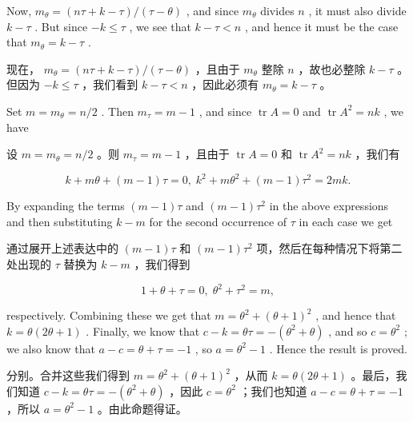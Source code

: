 \documentclass[10pt]{article}
\begin{document}
Now, \({m}_{\theta } = \left( {{n\tau } + k - \tau }\right) /\left( {\tau  - \theta }\right)\) , and since \({m}_{\theta }\) divides \(n\) , it must also divide \(k - \tau\) . But since \(- k \leq  \tau\) , we see that \(k - \tau  < n\) , and hence it must be the case that \({m}_{\theta } = k - \tau\) .

\begin{tcolorbox}\relax
现在， \({m}_{\theta } = \left( {{n\tau } + k - \tau }\right) /\left( {\tau  - \theta }\right)\) ，且由于 \({m}_{\theta }\) 整除 \(n\) ，故也必整除 \(k - \tau\) 。但因为 \(- k \leq  \tau\) ，我们看到 \(k - \tau  < n\) ，因此必须有 \({m}_{\theta } = k - \tau\) 。
\end{tcolorbox}

Set \(m = {m}_{\theta } = n/2\) . Then \({m}_{\tau } = m - 1\) , and since \(\operatorname{tr}A = 0\) and \(\operatorname{tr}{A}^{2} = {nk}\) , we have

\begin{tcolorbox}\relax
设 \(m = {m}_{\theta } = n/2\) 。则 \({m}_{\tau } = m - 1\) ，且由于 \(\operatorname{tr}A = 0\) 和 \(\operatorname{tr}{A}^{2} = {nk}\) ，我们有
\end{tcolorbox}

\[
k + {m\theta } + \left( {m - 1}\right) \tau  = 0,\;{k}^{2} + m{\theta }^{2} + \left( {m - 1}\right) {\tau }^{2} = {2mk}.
\]

By expanding the terms \(\left( {m - 1}\right) \tau\) and \(\left( {m - 1}\right) {\tau }^{2}\) in the above expressions and then substituting \(k - m\) for the second occurrence of \(\tau\) in each case we get

\begin{tcolorbox}\relax
通过展开上述表达中的 \(\left( {m - 1}\right) \tau\) 和 \(\left( {m - 1}\right) {\tau }^{2}\) 项，然后在每种情况下将第二处出现的 \(\tau\) 替换为 \(k - m\) ，我们得到
\end{tcolorbox}

\[
1 + \theta  + \tau  = 0,\;{\theta }^{2} + {\tau }^{2} = m,
\]

respectively. Combining these we get that \(m = {\theta }^{2} + {\left( \theta  + 1\right) }^{2}\) , and hence that \(k = \theta \left( {{2\theta } + 1}\right)\) . Finally, we know that \(c - k = {\theta \tau } =  - \left( {{\theta }^{2} + \theta }\right)\) , and so \(c = {\theta }^{2}\) ; we also know that \(a - c = \theta  + \tau  =  - 1\) , so \(a = {\theta }^{2} - 1\) . Hence the result is proved.

\begin{tcolorbox}\relax
分别。合并这些我们得到 \(m = {\theta }^{2} + {\left( \theta  + 1\right) }^{2}\) ，从而 \(k = \theta \left( {{2\theta } + 1}\right)\) 。最后，我们知道 \(c - k = {\theta \tau } =  - \left( {{\theta }^{2} + \theta }\right)\) ，因此 \(c = {\theta }^{2}\) ；我们也知道 \(a - c = \theta  + \tau  =  - 1\) ，所以 \(a = {\theta }^{2} - 1\) 。由此命题得证。
\end{tcolorbox}
\end{document}
